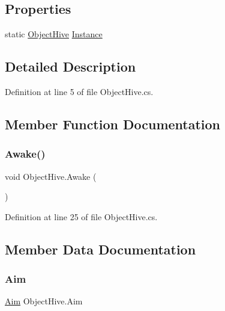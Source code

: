 \subsection*{Properties}
\begin{DoxyCompactItemize}
\item 
static \mbox{\hyperlink{class_object_hive}{Object\+Hive}} \mbox{\hyperlink{class_object_hive_a1e74114f0e3a5a7e6bbd998ade53eb53}{Instance}}
\end{DoxyCompactItemize}


\subsection{Detailed Description}


Definition at line 5 of file Object\+Hive.\+cs.



\subsection{Member Function Documentation}
\mbox{\label{class_object_hive_a003de014f458041bc4ed74e3a716d77b}} 
\subsubsection{\texorpdfstring{Awake()}{Awake()}}
{\footnotesize\ttfamily void Object\+Hive.\+Awake (\begin{DoxyParamCaption}{ }\end{DoxyParamCaption})}



Definition at line 25 of file Object\+Hive.\+cs.



\subsection{Member Data Documentation}
\mbox{\label{class_object_hive_af3fb446a374ca13950daefb4d408d621}} 
\subsubsection{\texorpdfstring{Aim}{Aim}}
{\footnotesize\ttfamily \mbox{\hyperlink{class_aim}{Aim}} Object\+Hive.\+Aim}



